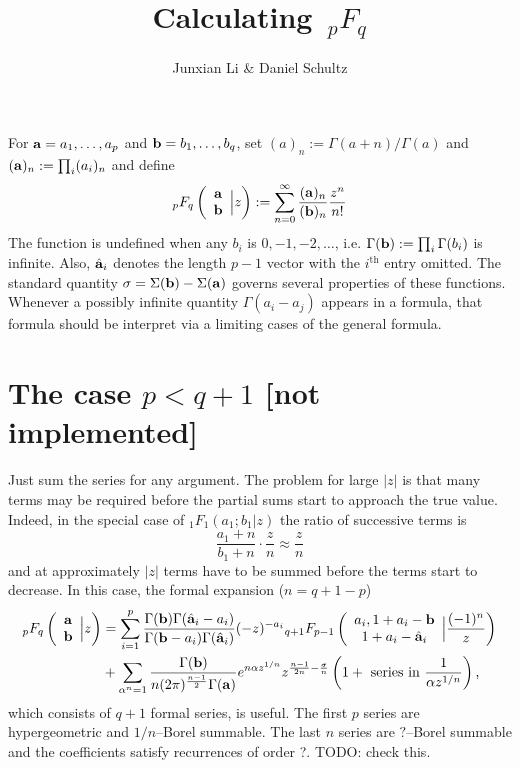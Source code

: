 \documentclass[10pt]{article}
\author{Junxian Li \& Daniel Schultz}
\title{Calculating $\, _{p}F_{q}$}
\date{}
\numberwithin{equation}{section}
\newcommand{\F}[5] {{}_{#1}F_{#2} \left( \begin{array}{c} #3 \\ #4 \end{array} \Big| #5  \right)}
\begin{document}
\maketitle

For $\bold{a}=a_1,\dots,a_p$ and  $\bold{b}=b_1,\dots,b_q$, set $(a)_n := \Gamma(a+n)/\Gamma(a)$ and $(\bold{a})_n := \prod_i (a_i)_n$ and define
\begin{equation}
\label{Fdef}
\F{p}{q}{\bold{a}}{\bold{b}}{z} := \sum_{n=0}^{\infty} \frac{(\bold{a})_n}{(\bold{b})_n} \frac{z^n}{n!}
\end{equation}
The function is undefined when any $b_i$ is $0,-1,-2,\dots$, i.e. $\Gamma(\bold{b}) := \prod_i \Gamma(b_i)$ is infinite. Also, $\hat{\bold{a}}_i$ denotes the length $p-1$ vector with the $i^{\text{th}}$ entry omitted. The standard quantity
$\sigma = \Sigma(\bold{b}) - \Sigma(\bold{a})$ governs several properties of these functions. Whenever a possibly infinite quantity $\Gamma(a_i-a_j)$ appears in a formula, that formula should be interpret via a limiting cases of the general formula.

\section{The case $p < q+1$ [not implemented]}
Just sum the series for any argument. The problem for large $|z|$ is that many terms may be required before the partial sums start to approach the true value. Indeed, in the special case of ${}_{1}F_{1}(a_1;b_1|z)$ the ratio of successive terms is
\begin{equation*}
\frac{a_1+n}{b_1+n} \cdot \frac{z}{n} \approx \frac{z}{n}
\end{equation*}
and at approximately $|z|$ terms have to be summed before the terms start to decrease. In this case, the formal expansion ($n = q+1-p$)
\begin{align*}
\F{p}{q}{\bold{a}}{\bold{b}}{z}&=\sum_{i=1}^{p} \frac{\Gamma(\bold{b}) \Gamma(\hat{\bold{a}}_i-a_i)}{\Gamma(\bold{b}-a_i) \Gamma(\hat{\bold{a}}_i)} (-z)^{-a_i} \F{q+1}{p-1}{a_i,1+a_i-\bold{b}}{1+a_i-\hat{\bold{a}}_i}{\frac{(-1)^n}{z}}\\
&+\sum_{\alpha^n=1} \frac{\Gamma(\bold{b})}{n (2 \pi )^{\frac{n-1}{2}} \Gamma(\bold{a})} e^{n \alpha z^{1/n}} z^{\frac{n-1}{2 n}-\frac{\sigma
   }{n}}\left(1 + \text{ series in } \frac{1}{\alpha z^{1/n}} \right)\text{,}
\end{align*}
which consists of $q+1$ formal series, is useful. The first $p$ series are hypergeometric and $1/n$--Borel summable. The last $n$ series are $?$--Borel summable and the coefficients satisfy recurrences of order ?. TODO: check this.
\end{document}
